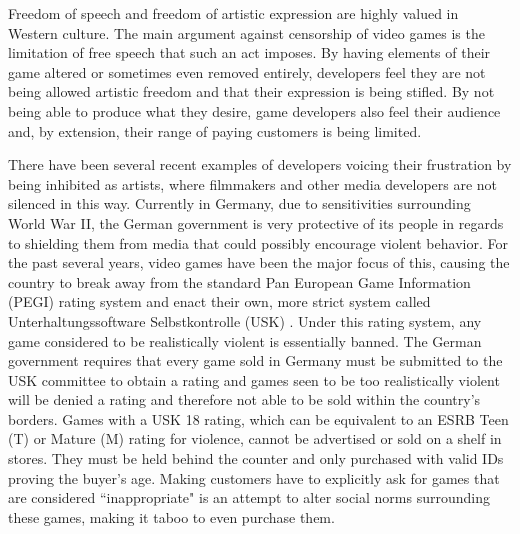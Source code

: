 Freedom of speech and freedom of artistic expression are highly valued in Western culture. The main argument against censorship of video games is the limitation of free speech that such an act imposes. By having elements of their game altered or sometimes even removed entirely, developers feel they are not being allowed artistic freedom and that their expression is being stifled. By not being able to produce what they desire, game developers also feel their audience and, by extension, their range of paying customers is being limited. 

There have been several recent examples of developers voicing their frustration by being inhibited as artists, where filmmakers and other media developers are not silenced in this way. Currently in Germany, due to sensitivities surrounding World War II, the German government is very protective of its people in regards to shielding them from media that could possibly encourage violent behavior. For the past several years, video games have been the major focus of this, causing the country to break away from the standard Pan European Game Information (PEGI) rating system \cite{pegi} and enact their own, more strict system called Unterhaltungssoftware Selbstkontrolle (USK) \cite{usk}. Under this rating system, any game considered to be realistically violent is essentially banned. The German government requires that every game sold in Germany must be submitted to the USK committee to obtain a rating and games seen to be too realistically violent will be denied a rating and therefore not able to be sold within the country's borders. Games with a USK 18 rating, which can be equivalent to an ESRB Teen (T) or Mature (M) rating for violence, cannot be advertised or sold on a shelf in stores. They must be held behind the counter and only purchased with valid IDs proving the buyer's age. Making customers have to explicitly ask for games that are considered ``inappropriate" is an attempt to alter social norms surrounding these games, making it taboo to even purchase them.

